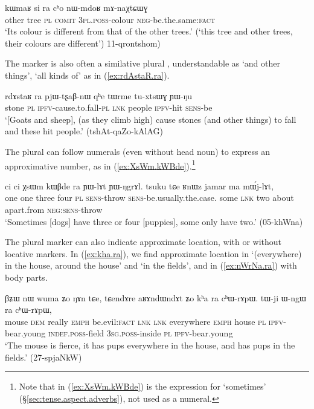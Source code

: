 \begin{exe}
\ex \label{ex:si.ra.cho}
\gll kɯmaʁ si ra cʰo nɯ-mdoʁ mɤ-naχtɕɯɣ \\
other tree \textsc{pl} \textsc{comit} \textsc{3pl}.\textsc{poss}-colour \textsc{neg}-be.the.same:\textsc{fact} \\
\glt `Its colour is different from that of the other trees.' (`this tree and other trees, their colours are different') 11-qrontshom)
\end{exe} 

The marker  is also often a similative plural \citep{mauri18categorization}, understandable as `and other things', `all kinds of' as in (\ref{ex:rdAstaR.ra}).

\begin{exe}
\ex \label{ex:rdAstaR.ra}
\gll rdɤstaʁ ra pjɯ-tʂaβ-nɯ qʰe tɯrme tu-xtsɯɣ ɲɯ-ŋu \\
stone \textsc{pl} \textsc{ipfv}-cause.to.fall-\textsc{pl} \textsc{lnk} people \textsc{ipfv}-hit \textsc{sens}-be \\
\glt `[Goats and sheep], (as they climb high) cause stones (and other things) to fall and these hit people.' (tshAt-qaZo-kAlAG) 
\end{exe} 

The plural can follow numerals (even without head noun) to express an approximative number, as in (\ref{ex:XsWm.kWBde}).\footnote{Note that in (\ref{ex:XsWm.kWBde})  is the expression for `sometimes' (§\ref{sec:tense.aspect.adverbs}), not used as a numeral.} 

\begin{exe}
\ex \label{ex:XsWm.kWBde}
\gll ci ci χsɯm kɯβde ra ɲɯ-lɤt ɲɯ-ŋgrɤl. tsuku tɕe ʁnɯz jamar ma mɯ́j-lɤt,\\
one one three four \textsc{pl} \textsc{sens}-throw \textsc{sens}-be.usually.the.case. some \textsc{lnk} two about apart.from \textsc{neg}:\textsc{sens}-throw \\
\glt  `Sometimes [dogs] have three or four [puppies], some only have two.' (05-khWna)
\end{exe} 

The plural marker  can also indicate approximate location, with or without locative markers. In (\ref{ex:kha.ra}), we find approximate location  in  `(everywhere) in the house, around the house' and  `in the fields', and in (\ref{ex:nWrNa.ra}) with body parts.
\largerpage
\begin{exe}
\ex \label{ex:kha.ra}
\gll βʑɯ nɯ wuma ʑo ŋɤn tɕe, tɕendɤre aʁɤndɯndɤt ʑo kʰa ra cʰɯ-rɤpɯ. tɯ-ji ɯ-ngɯ ra cʰɯ-rɤpɯ, \\
mouse \textsc{dem} really \textsc{emph} be.evil:\textsc{fact} \textsc{lnk} \textsc{lnk} everywhere \textsc{emph} house \textsc{pl} \textsc{ipfv}-bear.young \textsc{indef}.\textsc{poss}-field \textsc{3sg}.\textsc{poss}-inside \textsc{pl}  \textsc{ipfv}-bear.young \\
\glt `The mouse is fierce, it has pups everywhere in the house, and has pups in the fields.' (27-spjaNkW)
\end{exe} 

